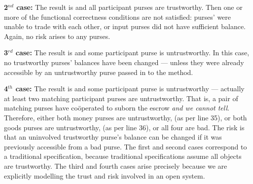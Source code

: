 \textbf{2$^{nd}$ case:} The result is  and all
participant purses are trustworthy. Then
one or more of  the functional correctness conditions are
  not satisfied: purses' were unable to trade with each other, or input
  purses did not have sufficient balance. Again, no risk arises
  to any purses.


\textbf{3$^{rd}$ case:} The result is  and some participant purse is untrustworthy.
  In this case, no   trustworthy purses' balances have been changed --- unless
  they were already accessible by an untrustworthy purse passed in to
  the method.

\textbf{4$^{th}$ case:}  The result is   and some participant
  purse is untrustworthy --- actually at least two
  matching participant purses are untrustworthy.
  That is, a pair of matching purses
  have co{\"o}perated to
  suborn the escrow \textit{and we cannot tell}.
 Therefore, either both money purses are untrustworthy,
 (as per line 35),  %
or both goods purses are untrustworthy,
 (as per line 36),
%
%
%
%
%
%
%
or all four are bad. %
%
The risk is that an uninvolved trustworthy purse's balance can be
changed if it was previously accessible from a bad purse.
%
%
%
%
The first and second cases correspond to a traditional
specification, because traditional specifications assume all objects
are trustworthy.  The third and fourth cases arise precisely because
we are explicitly modelling the trust and risk involved in an open
system.

